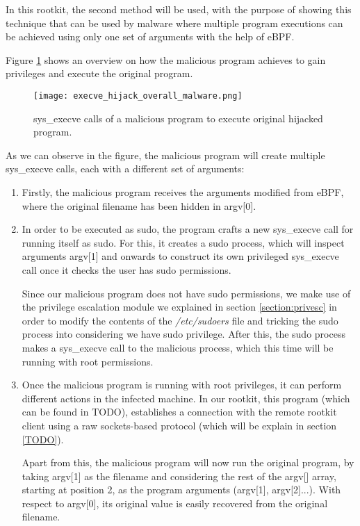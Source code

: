 In this rootkit, the second method will be used, with the purpose of showing this technique that can be used by malware where multiple program executions can be achieved using only one set of arguments with the help of eBPF.

Figure \ref{fig:execve_hijack_overall_malware} shows an overview on how the malicious program achieves to gain privileges and execute the original program.

\begin{figure}[htbp]
	\centering
	\texttt{[image: execve\_hijack\_overall\_malware.png]}
	\caption{sys\_execve calls of a malicious program to execute original hijacked program.}
	\label{fig:execve_hijack_overall_malware}
\end{figure}

As we can observe in the figure, the malicious program will create multiple sys\_execve calls, each with a different set of arguments:
\begin{enumerate}
\item Firstly, the malicious program receives the arguments modified from eBPF, where the original filename has been hidden in argv[0].
\item In order to be executed as sudo, the program crafts a new sys\_execve call for running itself as sudo. For this, it creates a sudo process, which will inspect arguments argv[1] and onwards to construct its own privileged sys\_execve call once it checks the user has sudo permissions. 

Since our malicious program does not have sudo permissions, we make use of the privilege escalation module we explained in section \ref{section:privesc} in order to modify the contents of the \textit{/etc/sudoers} file and tricking the sudo process into considering we have sudo privilege. After this, the sudo process makes a sys\_execve call to the malicious process, which this time will be running with root permissions.

\item Once the malicious program is running with root privileges, it can perform different actions in the infected machine. In our rootkit, this program (which can be found in TODO), establishes a connection with the remote rootkit client using a raw sockets-based protocol (which will be explain in section \ref{TODO}).

Apart from this, the malicious program will now run the original program, by taking argv[1] as the filename and considering the rest of the argv[] array, starting at position 2, as the program arguments (argv[1], argv[2]...). With respect to argv[0], its original value is easily recovered from the original filename. 
\end{enumerate}


